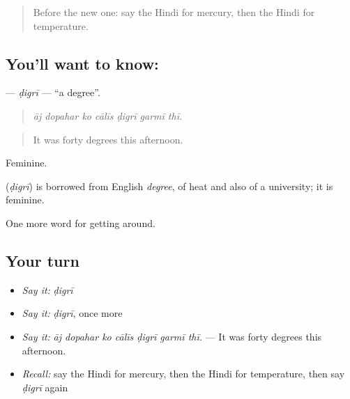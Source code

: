 \label{lesson:HI-C439-digri}



\begin{quote}
Before the new one: say the Hindi for mercury, then the Hindi for temperature.
\end{quote}

\subsection*{You'll want to know: }
\textbf{} — \emph{ḍigrī} — \textquotedblleft{}a degree\textquotedblright{}.

\begin{quote}
      
\end{quote}

\begin{quote}
\emph{āj dopahar ko cālīs ḍigrī garmī thī.}
\end{quote}

\begin{quote}
It was forty degrees this afternoon.
\end{quote}

Feminine.

\begin{cousinweb}
\textbf{} (\emph{ḍigrī}) is borrowed from English \emph{degree}, of heat and also of a university; it is feminine.
\end{cousinweb}

\begin{grammarlens}[title={What you've built}]
One more word for getting around.
\end{grammarlens}

\subsection*{Your turn}
\begin{itemize}
\raggedright
  \item \emph{Say it:} \emph{ḍigrī}
  \item \emph{Say it:} \emph{ḍigrī}, once more
  \item \emph{Say it:} \emph{āj dopahar ko cālīs ḍigrī garmī thī.} — It was forty degrees this afternoon.
  \item \emph{Recall:} say the Hindi for mercury, then the Hindi for temperature, then say \emph{ḍigrī} again
\end{itemize}

